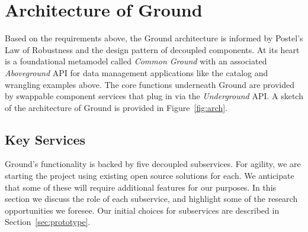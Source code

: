\documentclass{sig-alternate}
\begin{document}
\section{Architecture of Ground}
\label{sec:arch}
Based on the requirements above, the Ground architecture is informed by Postel's Law of Robustness and the design pattern of decoupled components. 
At its heart is a foundational metamodel called \emph{Common Ground} with an associated \emph{Aboveground} API for data management applications like the catalog and wrangling examples above. 
The core functions underneath Ground are provided by swappable component services that plug in via the \emph{Underground} API. 
A sketch of the architecture of Ground is provided in Figure~\ref{fig:arch}.


\subsection{Key Services}
Ground's functionality is backed by five decoupled subservices.  For agility, we are starting the project using existing open source solutions for each.  We anticipate that some of these will require additional features for our purposes. In this section we discuss the role of each subservice, and highlight some of the research opportunities we foresee.  Our initial choices for subservices are described in Section~\ref{sec:prototype}.
\end{document}
